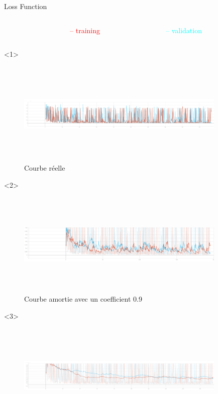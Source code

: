 \documentclass{beamer}
\newcommand{\rouge}{\textcolor{red}}
\begin{document}
\begin{frame}[t]{Loss Function}
  \begin{columns}
  \begin{column}[T]{0.01\textwidth}
  \end{column}
  \hfill
  \begin{column}[T]{0.5\textwidth}
    \rouge{-- training}
  \end{column}
  \begin{column}[T]{0.5\textwidth}
    \textcolor{cyan}{-- validation}
  \end{column}
  \end{columns}

  \begin{onlyenv}<1>
    \begin{figure}
      \includegraphics[width=10cm, height=5cm]{annex/loss_not_smoothed}
      \caption{Courbe réelle}
      \label{courbe}
    \end{figure}
  \end{onlyenv}
  \begin{onlyenv}<2>
    \begin{figure}
      \includegraphics[width=10cm, height=5cm]{annex/loss_smoothed_09}
      \caption{Courbe amortie avec un coefficient 0.9}
      \label{courbe}
    \end{figure}
  \end{onlyenv}
  \begin{onlyenv}<3>
    \begin{figure}
      \includegraphics[width=10cm, height=5cm]{annex/loss_smoothed_099}

\end{figure}
\end{onlyenv}
\end{frame}
\end{document}
